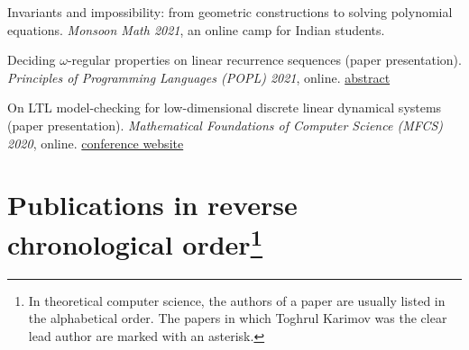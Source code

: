 \documentclass{article}
\begin{document}
\begin{etaremune}
		\item Invariants and impossibility: from geometric constructions to solving polynomial equations. \emph{Monsoon Math 2021}, an online camp for Indian students.
		
		\item Deciding $\omega$-regular properties on linear recurrence sequences (paper presentation). \emph{Principles of Programming Languages (POPL) 2021}, online. \href{https://popl21.sigplan.org/profile/toghrulkarimov}{abstract}
		
		\item  On LTL model-checking for low-dimensional discrete
		linear dynamical systems (paper presentation). \emph{Mathematical Foundations of Computer Science (MFCS) 2020}, online. \href{http://mfcs.mff.cuni.cz/2020/}{conference website}
	\end{etaremune}
	
	\vspace*{0.15cm}
	\section*{Publications in reverse chronological order\footnote{In theoretical computer science, the authors of a paper are usually listed in the alphabetical order. The papers in which Toghrul Karimov was the clear lead author are marked with an asterisk.}}
	
\end{document}
